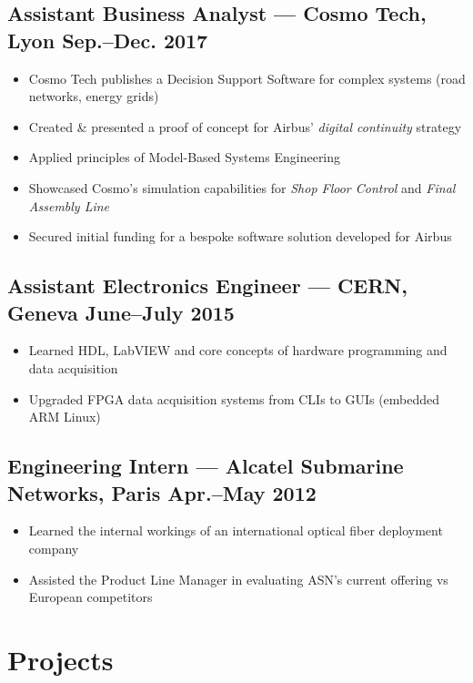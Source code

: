 \documentclass[10pt]{article}
\begin{document}
\subsection*{Assistant Business Analyst --- Cosmo Tech, Lyon \hfill Sep.--Dec. 2017}
\label{sec:org6fc7f0e}

\begin{itemize}
\item Cosmo Tech publishes a Decision Support Software for complex systems (road
networks, energy grids)
\item Created \& presented a proof of concept for Airbus' \emph{digital continuity}
strategy
\item Applied principles of Model-Based Systems Engineering
\item Showcased Cosmo’s simulation capabilities for \emph{Shop Floor Control} and \emph{Final
Assembly Line}
\item Secured initial funding for a bespoke software solution developed for Airbus
\end{itemize}

\subsection*{Assistant Electronics Engineer --- CERN, Geneva \hfill June--July 2015}
\label{sec:org689bff9}

\begin{itemize}
\item Learned HDL, LabVIEW and core concepts of hardware programming and data acquisition
\item Upgraded FPGA data acquisition systems from CLIs to GUIs (embedded ARM Linux)
\end{itemize}

\subsection*{Engineering Intern --- Alcatel Submarine Networks, Paris \hfill Apr.--May 2012}
\label{sec:orgc4bb4cc}

\begin{itemize}
\item Learned the internal workings of an international optical fiber deployment
company
\item Assisted the Product Line Manager in evaluating ASN's current offering vs
European competitors
\end{itemize}

\section*{Projects}
\label{sec:org0e26638}
\end{document}
